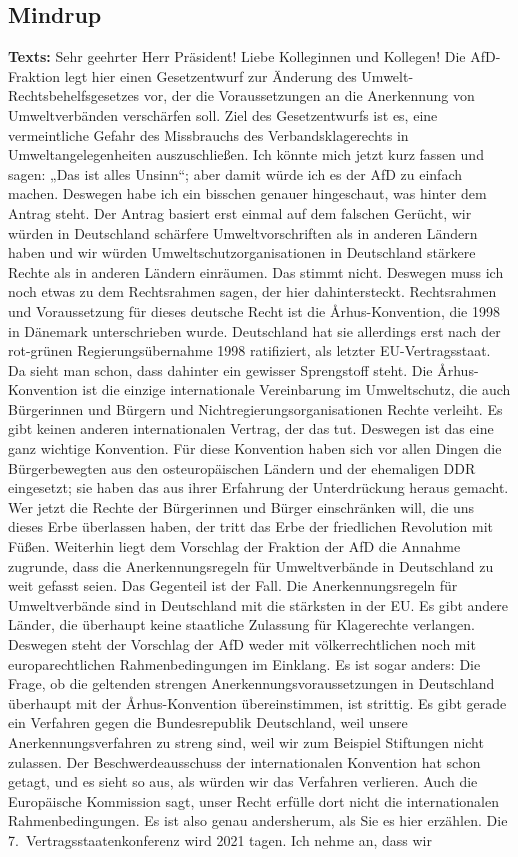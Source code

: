 \documentclass{article}
\begin{document}
\subsection{Mindrup}
\noindent\textbf{Texts:} Sehr geehrter Herr Präsident! Liebe Kolleginnen und Kollegen! Die AfD-Fraktion legt hier einen Gesetzentwurf zur Änderung des Umwelt-Rechtsbehelfsgesetzes vor, der die Voraussetzungen an die Anerkennung von Umweltverbänden verschärfen soll. Ziel des Gesetzentwurfs ist es, eine vermeintliche Gefahr des Missbrauchs des Verbandsklagerechts in Umweltangelegenheiten auszuschließen. Ich könnte mich jetzt kurz fassen und sagen: „Das ist alles Unsinn“; aber damit würde ich es der AfD zu einfach machen. Deswegen habe ich ein bisschen genauer hingeschaut,  was hinter dem Antrag steht. Der Antrag basiert erst einmal auf dem falschen Gerücht, wir würden in Deutschland schärfere Umweltvorschriften als in anderen Ländern haben und wir würden Umweltschutzorganisationen in Deutschland stärkere Rechte als in anderen Ländern einräumen. Das stimmt nicht. Deswegen muss ich noch etwas zu dem Rechtsrahmen sagen, der hier dahintersteckt. Rechtsrahmen und Voraussetzung für dieses deutsche Recht ist die Århus-Konvention, die 1998 in Dänemark unterschrieben wurde. Deutschland hat sie allerdings erst nach der rot-grünen Regierungsübernahme 1998 ratifiziert, als letzter EU-Vertragsstaat. Da sieht man schon, dass dahinter ein gewisser Sprengstoff steht.  Die Århus-Konvention ist die einzige internationale Vereinbarung im Umweltschutz, die auch Bürgerinnen und Bürgern und Nichtregierungsorganisationen Rechte verleiht. Es gibt keinen anderen internationalen Vertrag, der das tut. Deswegen ist das eine ganz wichtige Konvention.  Für diese Konvention haben sich vor allen Dingen die Bürgerbewegten aus den osteuropäischen Ländern und der ehemaligen DDR eingesetzt; sie haben das aus ihrer Erfahrung der Unterdrückung heraus gemacht. Wer jetzt die Rechte der Bürgerinnen und Bürger einschränken will, die uns dieses Erbe überlassen haben, der tritt das Erbe der friedlichen Revolution mit Füßen.  Weiterhin liegt dem Vorschlag der Fraktion der AfD die Annahme zugrunde, dass die Anerkennungsregeln für Umweltverbände in Deutschland zu weit gefasst seien. Das Gegenteil ist der Fall. Die Anerkennungsregeln für Umweltverbände sind in Deutschland mit die stärksten in der EU. Es gibt andere Länder, die überhaupt keine staatliche Zulassung für Klagerechte verlangen. Deswegen steht der Vorschlag der AfD weder mit völkerrechtlichen noch mit europarechtlichen Rahmenbedingungen im Einklang. Es ist sogar anders: Die Frage, ob die geltenden strengen Anerkennungsvoraussetzungen in Deutschland überhaupt mit der Århus-Konvention übereinstimmen, ist strittig. Es gibt gerade ein Verfahren gegen die Bundesrepublik Deutschland, weil unsere Anerkennungsverfahren zu streng sind, weil wir zum Beispiel Stiftungen nicht zulassen. Der Beschwerdeausschuss der internationalen Konvention hat schon getagt, und es sieht so aus, als würden wir das Verfahren verlieren. Auch die Europäische Kommission sagt, unser Recht erfülle dort nicht die internationalen Rahmenbedingungen. Es ist also genau andersherum, als Sie es hier erzählen. Die 7. Vertragsstaatenkonferenz wird 2021 tagen. Ich nehme an, dass wir 
\end{document}
